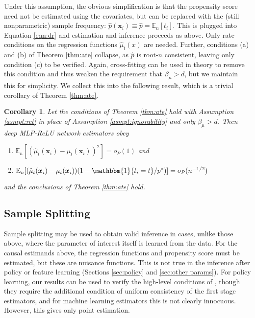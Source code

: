 \documentclass[11pt]{article}
\newtheorem{corollary}{Corollary}
\numberwithin{equation}{section}
\theoremstyle{definition}
\newcommand{\E}{\mathbb{E}}
\newcommand{\En}{\mathbb{E}_n}
\newcommand{\One}{\mathbbm{1}}
\newcommand{\bx}{\bm{x}}
\begin{document}
Under this assumption, the obvious simplification is that the propensity score need not be estimated using the covariates, but can be replaced with the (still nonparametric) sample frequency: $\hat{p}(\bx_i) \equiv \hat{p} = \En [t_i]$. This is plugged into Equation \eqref{eqn:dr} and estimation and inference proceeds as above. Only rate conditions on the regression functions $\hat{\mu}_t(x)$ are needed. Further, conditions (a) and (b) of Theorem \ref{thm:ate} collapse, as $\hat{p}$ is root-$n$ consistent, leaving only condition (c) to be verified. Again, cross-fitting can be used in theory to remove this condition and thus weaken the requirement that $\beta_\mu > d$, but we maintain this for simplicity. We collect this into the following result, which is a trivial corollary of Theorem \ref{thm:ate}. 
\begin{corollary}
	\label{cor:rct}
	Let the conditions of Theorem \ref{thm:ate} hold with Assumption \ref{asmpt:rct} in place of Assumption \ref{asmpt:ignorability} and only $\beta_\mu > d$. Then deep MLP-ReLU network estimators obey 
		\begin{enumerate}
	
			\item[{\bf (a$^\prime$)}] $\E_n \left[ (\hat{\mu}_t(\bx_i) - \mu_t(\bx_i))^2\right]  = o_P(1)$ and
			
			\item[{\bf (c$^\prime$)}] $ \E_n[ (\hat{\mu}_t(\bx_i) - \mu_t(\bx_i)) (1 - \One\{t_i=t\}/ p^*)]    = o_P(n^{-1/2})$
	
		\end{enumerate}
	and the conclusions of Theorem \ref{thm:ate} hold.
\end{corollary}









\subsection{Sample Splitting}
	\label{sec:splitting}
	
	
Sample splitting may be used to obtain valid inference in cases, unlike those above, where the parameter of interest itself is learned from the data. For the causal estimands above, the regression functions and propensity score must be estimated, but these are nuisance functions. This is not true in the inference after policy or feature learning (Sections \ref{sec:policy} and \ref{sec:other params}). For policy learning, our results can be used to verify the high-level conditions of \cite{Athey-Wager2018_WP}, though they require the additional condition of uniform consistency of the first stage estimators, and for machine learning estimators this is not clearly innocuous. However, this gives only point estimation. 
\end{document}
